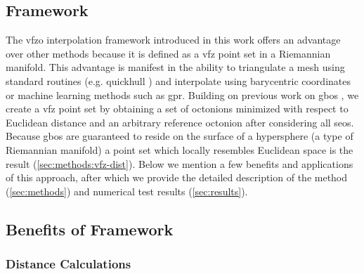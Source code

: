 \documentclass[final,twocolumn,12pt]{elsarticle}
\begin{document}
\subsection{ Framework}
The \gls{vfzo} interpolation framework introduced in this work offers an advantage over other methods because it is defined as a \gls{vfz} point set in a Riemannian manifold. This advantage is manifest in the ability to triangulate a mesh using standard routines (e.g. quickhull \cite{barberQuickhullAlgorithmConvex1996}) and interpolate using barycentric coordinates or machine learning methods such as \gls{gpr}. Building on previous work on \glspl{gbo} \cite{francisGeodesicOctonionMetric2019,chesserLearningGrainBoundary2020}, we create a \gls{vfz} point set by obtaining a set of octonions minimized with respect to Euclidean distance and an arbitrary reference octonion after considering all \glspl{seo}. Because \glspl{gbo} are guaranteed to reside on the surface of a hypersphere \cite{francisGeodesicOctonionMetric2019} (a type of Riemannian manifold) a point set which locally resembles Euclidean space is the result (\cref{sec:methods:vfz-dist}). Below we mention a few benefits and applications of this approach, after which we provide the detailed description of the method (\cref{sec:methods}) and numerical test results (\cref{sec:results}).

\subsection{Benefits of  Framework}
\subsubsection{Distance Calculations}
\label{sec:intro:distancecalculations}
\end{document}
